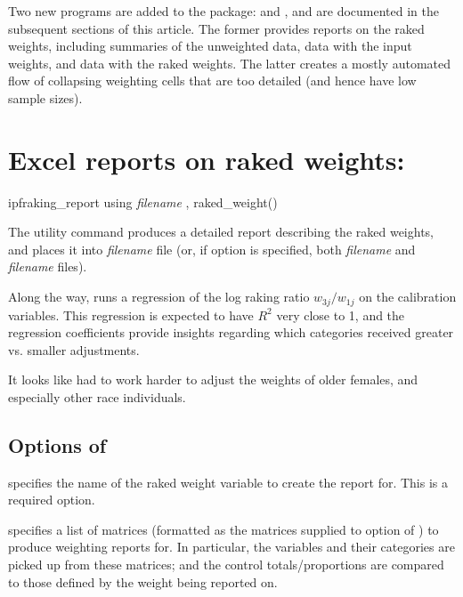 Two new programs are added to the package:  and ,
and are documented in the subsequent sections of this article. The former provides reports on the raked weights,
including summaries of the unweighted data, data with the input weights, and data with the raked weights.
The latter creates a mostly automated flow of collapsing weighting cells that are too detailed
(and hence have low sample sizes).

\section{Excel reports on raked weights:  }

\begin{stsyntax}
ipfraking\_report
using \textit{filename}
,
raked\_weight(\varname)
\end{stsyntax}

The utility command  produces a detailed report
describing the raked weights, and places it into \textit{filename} file
(or, if  option is specified, both \textit{filename} and \textit{filename}
files).

Along the way,  runs a regression of the log raking ratio $w_{3j}/w_{1j}$
on the calibration variables. This regression is expected to have $R^2$ very close to 1,
and the regression coefficients provide insights regarding which categories received
greater vs. smaller adjustments.

\begin{stlog}
\nullskip
\end{stlog}

It looks like  had to work harder to adjust the weights of older females,
and especially other race individuals.

\subsection{Options of }

\hangpara
{} specifies the name of the raked weight variable to create
    the report for. This is a required option.

\hangpara
{} specifies a list of matrices (formatted as the matrices
    supplied to  option of ) to produce weighting reports for.
    In particular, the variables and their categories are picked up from these matrices;
    and the control totals/proportions are compared to those defined by the weight being reported on.

